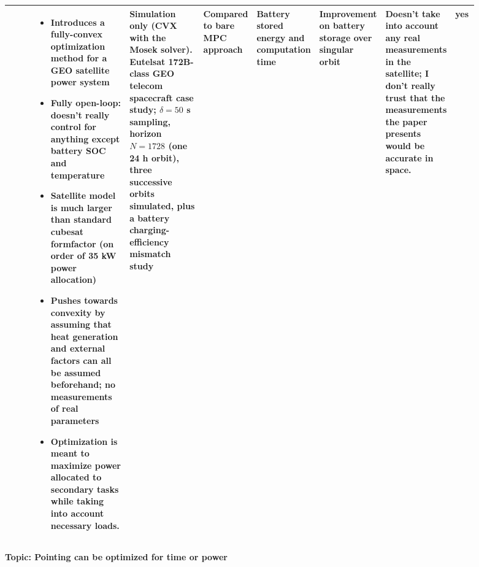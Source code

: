{\begin{longtable}{@{}p{0.06\linewidth}p{0.20\linewidth}p{0.16\linewidth}p{0.10\linewidth}p{0.09\linewidth}p{0.11\linewidth}p{0.12\linewidth}p{0.05\linewidth}@{}}
    \cite{doff-sottaSpacecraftEnergyManagement2022} & 
    \begin{minipage}[t]{\linewidth}
    \begin{itemize}[nosep, left-margin=1em]
        \item Introduces a fully-convex optimization method for a GEO satellite power system 
        \item Fully open-loop: doesn't really control for anything except battery SOC and temperature
        \item Satellite model is much larger than standard cubesat formfactor (on order of 35 kW power allocation)
        \item Pushes towards convexity by assuming that heat generation and external factors can all be assumed beforehand; no measurements of real parameters
        \item Optimization is meant to maximize power allocated to secondary tasks while taking into account necessary loads.\strut
    \end{itemize}
    \end{minipage} &
    Simulation only (CVX with the Mosek solver). Eutelsat 172B-class GEO telecom spacecraft case study; $\delta = 50$ s sampling, horizon $N = 1728$ (one 24 h orbit), three successive orbits simulated, plus a battery charging-efficiency mismatch study &
    Compared to bare MPC approach &
    Battery stored energy and computation time&
    Improvement on battery storage over singular orbit &
    Doesn't take into account any real measurements in the satellite; I don't really trust that the measurements the paper presents would be accurate in space. & 
    yes \\
  \bottomrule
\end{longtable}}

\textbf{Topic: Pointing can be optimized for time or power} 

